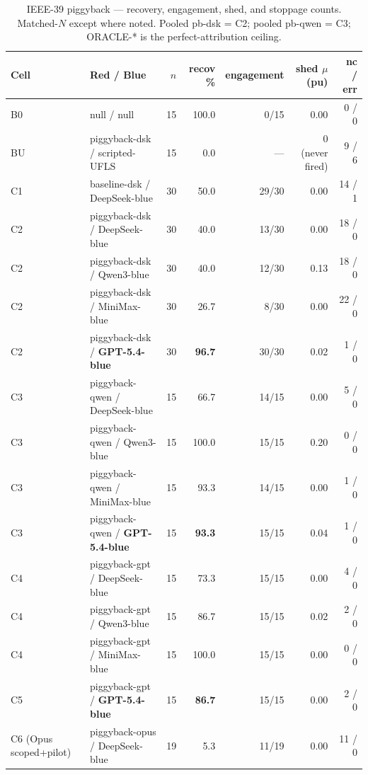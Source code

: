 \documentclass[journal,twocolumn,10pt]{IEEEtran}
\begin{document}
\begin{table}[tb]
\centering
\caption{IEEE-39 piggyback --- recovery, engagement, shed, and stoppage counts. Matched-$N$ except where noted. Pooled pb-dsk = C2; pooled pb-qwen = C3; ORACLE-* is the perfect-attribution ceiling.}
\label{tab:recov}
\small
\begin{tabular}{@{}llrrrrr@{}}
\toprule
Cell & Red / Blue & $n$ & recov \% & engagement & shed $\mu$ (pu) & nc / err \\
\midrule
B0        & null / null                        & 15 & 100.0 & 0/15  & 0.00 & 0 / 0 \\
BU        & piggyback-dsk / scripted-UFLS      & 15 &   0.0 & ---   & 0 (never fired) & 9 / 6 \\
C1        & baseline-dsk / DeepSeek-blue       & 30 &  50.0 & 29/30 & 0.00 & 14 / 1 \\
C2        & piggyback-dsk / DeepSeek-blue      & 30 &  40.0 & 13/30 & 0.00 & 18 / 0 \\
C2        & piggyback-dsk / Qwen3-blue         & 30 &  40.0 & 12/30 & 0.13 & 18 / 0 \\
C2        & piggyback-dsk / MiniMax-blue       & 30 &  26.7 &  8/30 & 0.00 & 22 / 0 \\
C2        & piggyback-dsk / \textbf{GPT-5.4-blue}       & 30 & \textbf{96.7} & 30/30 & 0.02 &  1 / 0 \\
C3        & piggyback-qwen / DeepSeek-blue     & 15 &  66.7 & 14/15 & 0.00 &  5 / 0 \\
C3        & piggyback-qwen / Qwen3-blue        & 15 & 100.0 & 15/15 & 0.20 &  0 / 0 \\
C3        & piggyback-qwen / MiniMax-blue      & 15 &  93.3 & 14/15 & 0.00 &  1 / 0 \\
C3        & piggyback-qwen / \textbf{GPT-5.4-blue}      & 15 &  \textbf{93.3} & 15/15 & 0.04 &  1 / 0 \\
C4        & piggyback-gpt / DeepSeek-blue      & 15 &  73.3 & 15/15 & 0.00 &  4 / 0 \\
C4        & piggyback-gpt / Qwen3-blue         & 15 &  86.7 & 15/15 & 0.02 &  2 / 0 \\
C4        & piggyback-gpt / MiniMax-blue       & 15 & 100.0 & 15/15 & 0.00 &  0 / 0 \\
C5        & piggyback-gpt / \textbf{GPT-5.4-blue}       & 15 &  \textbf{86.7} & 15/15 & 0.00 &  2 / 0 \\
\midrule
C6 (Opus scoped+pilot) & piggyback-opus / DeepSeek-blue     & 19 &  5.3 & 11/19 & 0.00 & 11 / 0 \\

\end{tabular}
\end{table}
\end{document}
